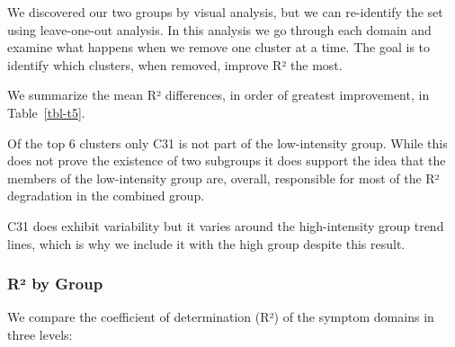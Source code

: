 \documentclass[
  letterpaper,
  DIV=11,
  numbers=noendperiod]{scrartcl}
\begin{document}
We discovered our two groups by visual analysis, but we can re-identify
the set using leave-one-out analysis. In this analysis we go through
each domain and examine what happens when we remove one cluster at a
time. The goal is to identify which clusters, when removed, improve R²
the most.

We summarize the mean R² differences, in order of greatest improvement,
in Table~\ref{tbl-t5}.

\begin{table}[h]

\caption{\label{tbl-t5}Leave-one-out Analysis}


\end{table}%

Of the top 6 clusters only C31 is not part of the low-intensity group.
While this does not prove the existence of two subgroups it does support
the idea that the members of the low-intensity group are, overall,
responsible for most of the R² degradation in the combined group.

C31 does exhibit variability but it varies around the high-intensity
group trend lines, which is why we include it with the high group
despite this result.

\FloatBarrier 
\bigskip

\subsubsection*{R² by Group}\label{sec-r2-group}

We compare the coefficient of determination (R²) of the symptom domains
in three levels:
\end{document}
